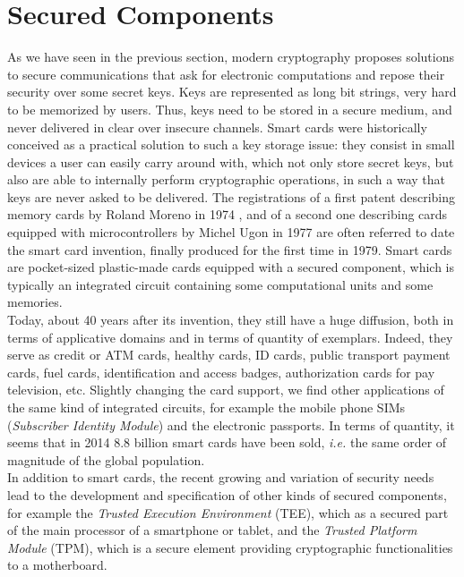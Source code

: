 \section{Secured Components}

As we have seen in the previous section, modern cryptography proposes solutions to secure communications that ask for electronic computations and repose their security over some secret keys. Keys are represented as long bit strings, very hard to be memorized by users. Thus, keys need to be stored in a secure medium, and never delivered in clear over insecure channels. Smart cards were historically conceived as a practical solution to such a key storage issue: they consist in small devices a user can easily carry around with, which not only store secret keys, but also are able to internally perform cryptographic operations, in such a way that keys are never asked to be delivered. The registrations of a first patent describing memory cards by Roland Moreno in 1974 \cite{moreno}, and of a second one describing cards equipped with microcontrollers by Michel Ugon in 1977 \cite{ugon} are often referred to date the smart card invention, finally produced for the first time in 1979. Smart cards are pocket-sized plastic-made cards equipped with a secured component, which is typically an integrated circuit containing some computational units and some memories.\\

Today, about 40 years after its invention, they still have a huge diffusion, both in terms of applicative domains and in terms of quantity of exemplars. Indeed, they serve as credit or ATM cards, healthy cards, ID cards, public transport payment cards, fuel cards, identification and access badges, authorization cards for pay television, etc. Slightly changing the card support, we find other applications of the same kind of integrated circuits, for example the  mobile phone SIMs (\emph{Subscriber Identity Module}) and the electronic passports. In terms of quantity, it seems that in 2014 8.8 billion smart cards have been sold, \emph{i.e.} the same order of magnitude of the global population. \\

In addition to smart cards, the recent growing and variation of security needs lead to the development and specification of other kinds of secured components, for example the \emph{Trusted Execution Environment} (TEE), which as a secured part of the main processor of a smartphone or tablet, and the \emph{Trusted Platform Module} 
(TPM), which is a secure element providing cryptographic functionalities to a motherboard. 

